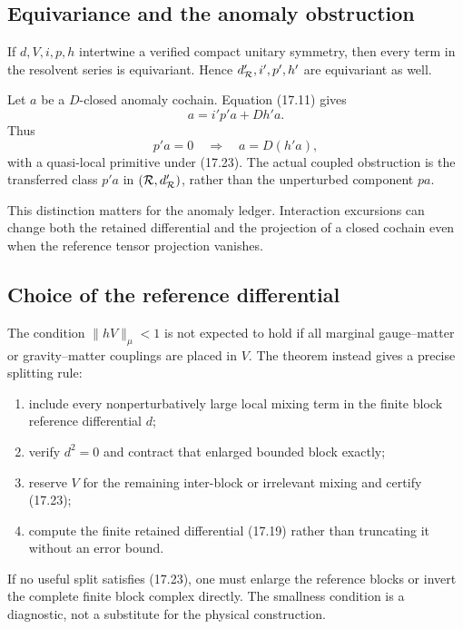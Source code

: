 \documentclass[11pt]{article}
\theoremstyle{remark}
\begin{document}
\subsection{Equivariance and the anomaly obstruction}

If \(d,V,i,p,h\) intertwine a verified compact unitary symmetry, then
every term in the resolvent series is equivariant.  Hence
\(d_{\cal R}',i',p',h'\) are equivariant as well.

Let \(a\) be a \(D\)-closed anomaly cochain.  Equation (17.11) gives
\[
                         a=i'p'a+D h'a.                     \tag{17.25}
\]
Thus
\[
 p'a=0\quad\Longrightarrow\quad
 a=D(h'a),                                                  \tag{17.26}
\]
with a quasi-local primitive under (17.23).  The actual coupled
obstruction is the transferred class \(p'a\) in
\(({\cal R},d_{\cal R}')\), rather than the unperturbed component
\(pa\).

This distinction matters for the anomaly ledger.  Interaction
excursions can change both the retained differential and the
projection of a closed cochain even when the reference tensor
projection vanishes.

\subsection{Choice of the reference differential}

The condition \(\|hV\|_\mu<1\) is not expected to hold if all
marginal gauge--matter or gravity--matter couplings are placed in
\(V\).  The theorem instead gives a precise splitting rule:

\begin{enumerate}
\item include every nonperturbatively large local mixing term in the
      finite block reference differential \(d\);
\item verify \(d^2=0\) and contract that enlarged bounded block
      exactly;
\item reserve \(V\) for the remaining inter-block or irrelevant
      mixing and certify (17.23);
\item compute the finite retained differential (17.19) rather than
      truncating it without an error bound.
\end{enumerate}

If no useful split satisfies (17.23), one must enlarge the reference
blocks or invert the complete finite block complex directly.  The
smallness condition is a diagnostic, not a substitute for the
physical construction.
\end{document}
